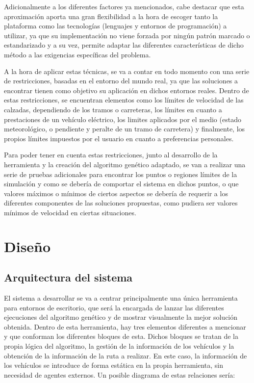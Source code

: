 \documentclass[11pt,spanish,listoffigures,listoftables]{tfgetsinf}
\begin{document}
Adicionalmente a los diferentes factores ya mencionados, cabe destacar que esta aproximación aporta una gran flexibilidad a la hora de escoger tanto la plataforma como las tecnologías (lenguajes y entornos de programación) a utilizar, ya que su implementación no viene forzada por ningún patrón marcado o estandarizado y a su vez, permite adaptar las diferentes características de dicho método a las exigencias específicas del problema.

A la hora de aplicar estas técnicas, se va a contar en todo momento con una serie de restricciones, basadas en el entorno del mundo real, ya que las soluciones a encontrar tienen como objetivo su aplicación en dichos entornos reales. Dentro de estas restricciones, se encuentran elementos como los límites de velocidad de las calzadas, dependiendo de los tramos o carreteras, los límites en cuanto a prestaciones de un vehículo eléctrico, los limites aplicados por el medio (estado meteorológico, o pendiente y peralte de un tramo de carretera) y finalmente, los propios límites impuestos por el usuario en cuanto a preferencias personales.

Para poder tener en cuenta estas restricciones, junto al desarrollo de la herramienta y la creación del algoritmo genético adaptado, se van a realizar una serie de pruebas adicionales para encontrar los puntos o regiones límites de la simulación y como se debería de comportar el sistema en dichos puntos, o que valores máximos o mínimos de ciertos aspectos se debería de requerir a los diferentes componentes de las soluciones propuestas, como pudiera ser valores mínimos de velocidad en ciertas situaciones.

\chapter{Diseño}
\section{Arquitectura del sistema}
El sistema a desarrollar se va a centrar principalmente una única herramienta para entornos de escritorio, que será la encargada de lanzar las diferentes ejecuciones del algoritmo genético y de mostrar visualmente la mejor solución obtenida. Dentro de esta herramienta, hay tres elementos diferentes a mencionar y que conforman los diferentes bloques de esta. Dichos bloques se tratan de la propia lógica del algoritmo, la gestión de la información de los vehículos y la obtención de la información de la ruta a realizar. En este caso, la información de los vehículos se introduce de forma estática en la propia herramienta, sin necesidad de agentes externos. Un posible diagrama de estas relaciones sería:
\end{document}
